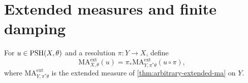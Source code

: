 



\section{Extended measures and finite damping}

For $u\in\mathrm{PSH}(X,\theta)$ and a resolution $\pi\colon Y\to X$, define
\begin{equation}\label{eq:space-extended-ma}
 \mathrm{MA}^{\mathrm{ext}}_{X,\theta}(u)
   =\pi_*\mathrm{MA}^{\mathrm{ext}}_{Y,\pi^*\theta}(u\circ\pi),
\end{equation}
where $\mathrm{MA}^{\mathrm{ext}}_{Y,\pi^*\theta}$ is the extended measure of \cref{thm:arbitrary-extended-ma} on $Y$.

